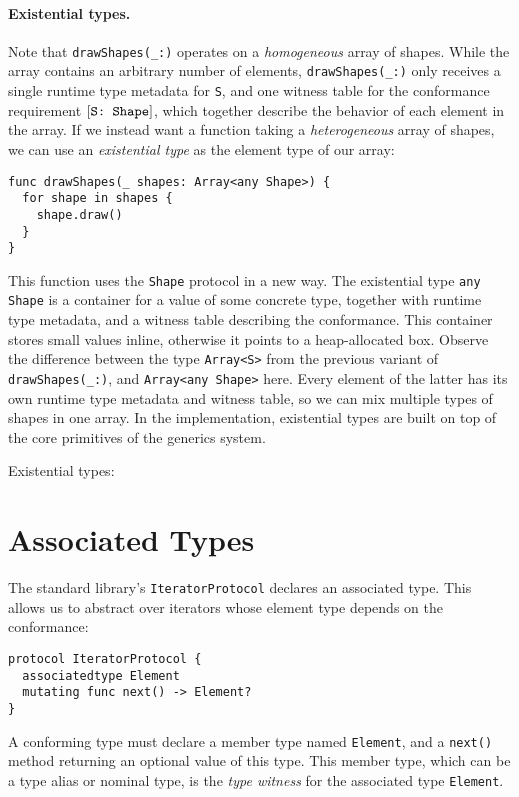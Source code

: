 \documentclass[../generics]{subfiles}
\begin{document}
\paragraph{Existential types.}
Note that \verb|drawShapes(_:)| operates on a \emph{homogeneous} array of shapes. While the array contains an arbitrary number of elements, \verb|drawShapes(_:)| only receives a single runtime type metadata for \texttt{S}, and one witness table for the conformance requirement $[\texttt{S:~Shape}]$, which together describe the behavior of each element in the array. If we instead want a function taking a \emph{heterogeneous} array of shapes, we can use an \emph{existential type} as the element type of our array:
\begin{Verbatim}
func drawShapes(_ shapes: Array<any Shape>) {
  for shape in shapes {
    shape.draw()
  }
}
\end{Verbatim}

This function uses the \texttt{Shape} protocol in a new way. The existential type \texttt{any Shape} is a container for a value of some concrete type, together with runtime type metadata, and a witness table describing the conformance. This container stores small values inline, otherwise it points to a heap-allocated box. Observe the difference between the type \texttt{Array<S>} from the previous variant of \verb|drawShapes(_:)|, and \texttt{Array<any Shape>} here. Every element of the latter has its own runtime type metadata and witness table, so we can mix multiple types of shapes in one array. In the implementation, existential types are built on top of the core primitives of the generics system.

\begin{MoreDetails}
\item Existential types: 
\end{MoreDetails}

\section{Associated Types}

The standard library's \texttt{IteratorProtocol} declares an associated type. This allows us to abstract over iterators whose element type depends on the conformance:
\begin{Verbatim}
protocol IteratorProtocol {
  associatedtype Element
  mutating func next() -> Element?
}
\end{Verbatim}
A conforming type must declare a member type named \texttt{Element}, and a \texttt{next()} method returning an optional value of this type. This member type, which can be a type alias or nominal type, is the \emph{type witness} for the associated type \texttt{Element}.
\end{document}
